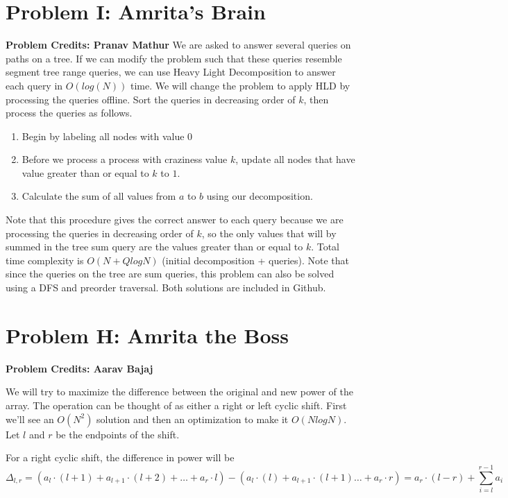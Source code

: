 \documentclass{article}
\begin{document}
\section{Problem I: Amrita's Brain}
\textbf{Problem Credits: Pranav Mathur}\newline
We are asked to answer several queries on paths on a tree. If we can modify the problem such that these queries resemble segment tree range queries, we can use Heavy Light Decomposition to answer each query in $O(log(N))$ time.\newline\newline
We will change the problem to apply HLD by processing the queries offline. Sort the queries in decreasing order of $k$, then process the queries as follows.
\begin{enumerate}
    \item Begin by labeling all nodes with value $0$
    \item Before we process a process with craziness value $k$, update all nodes that have value greater than or equal to $k$ to $1$.
    \item Calculate the sum of all values from $a$ to $b$ using our decomposition.
\end{enumerate}
Note that this procedure gives the correct answer to each query because we are processing the queries in decreasing order of $k$, so the only values that will by summed in the tree sum query are the values greater than or equal to $k$. Total time complexity is $O(N + QlogN)$ (initial decomposition + queries).\newline\newline
Note that since the queries on the tree are sum queries, this problem can also be solved using a DFS and preorder traversal. Both solutions are included in Github.

\section{Problem H: Amrita the Boss}
\textbf{Problem Credits: Aarav Bajaj}

\noindent We will try to maximize the difference between the original and new power of the array. The operation can be thought of as either a right or left cyclic shift. First we'll see an $O(N^2)$ solution and then an optimization to make it $O(NlogN)$. Let $l$ and $r$ be the endpoints of the shift. 

\noindent For a right cyclic shift, the difference in power will be $$\Delta_{l, r} = (a_l\cdot(l+1) + a_{l+1}\cdot(l+2)+ \ldots + a_r\cdot l) - (a_l\cdot(l) + a_{l+1}\cdot(l+1) \ldots + a_{r}\cdot r) = a_r \cdot (l - r) + \sum_{i=l}^{r-1} a_i$$
\end{document}
